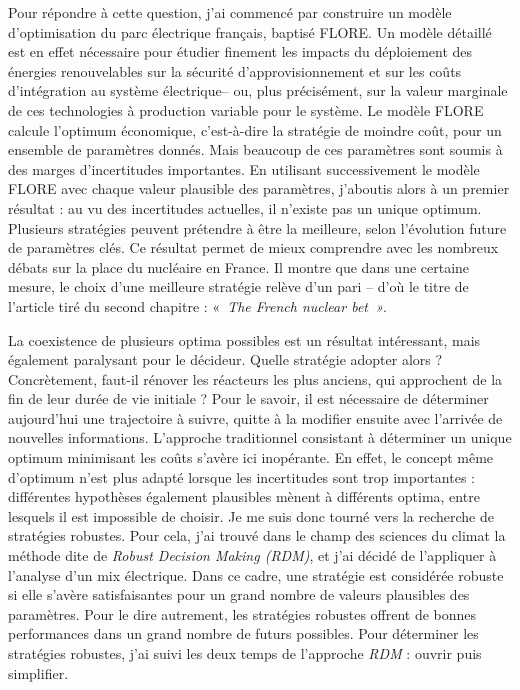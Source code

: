 Pour répondre à cette question, j'ai commencé par construire un modèle d'optimisation du parc électrique français, baptisé FLORE. Un modèle détaillé est en effet nécessaire pour étudier finement les impacts du déploiement des énergies renouvelables sur la sécurité d'approvisionnement et sur les coûts d'intégration au système électrique-- ou, plus précisément, sur la valeur marginale de ces technologies à production variable pour le système.
Le modèle FLORE calcule l'optimum économique, c'est-à-dire la stratégie de moindre coût, pour un ensemble de paramètres donnés. Mais beaucoup de ces paramètres sont soumis à des marges d'incertitudes importantes. En utilisant successivement le modèle FLORE avec chaque valeur plausible des paramètres, j'aboutis alors à un premier résultat : au vu des incertitudes actuelles, il n'existe pas un unique optimum. Plusieurs stratégies peuvent prétendre à être la meilleure, selon l'évolution future de paramètres clés.
Ce résultat permet de mieux comprendre avec les nombreux débats sur la place du nucléaire en France. Il montre que dans une certaine mesure, le choix d'une meilleure stratégie relève d'un pari -- d'où le titre de l'article tiré du second chapitre : «~\textit{The French nuclear bet~»}.


La coexistence de plusieurs optima possibles est un résultat intéressant, mais également paralysant pour le décideur. Quelle stratégie adopter alors ? Concrètement, faut-il rénover les réacteurs les plus anciens, qui approchent de la fin de leur durée de vie initiale ? Pour le savoir, il est nécessaire de déterminer aujourd'hui une trajectoire à suivre, quitte à la modifier ensuite avec l'arrivée de nouvelles informations.
L'approche traditionnel consistant à déterminer un unique optimum minimisant les coûts s'avère ici inopérante. En effet, le concept même d’optimum n’est plus adapté lorsque les incertitudes sont trop importantes : différentes hypothèses également plausibles mènent à différents optima, entre lesquels il est impossible de choisir. 
Je me suis donc tourné vers la recherche de stratégies robustes. Pour cela, j'ai trouvé dans le champ des sciences du climat la méthode dite de \textit{Robust Decision Making (RDM)}, et j'ai décidé de l'appliquer à l'analyse d'un mix électrique. Dans ce cadre, une stratégie est considérée robuste si elle s'avère satisfaisantes pour un grand nombre de valeurs plausibles des paramètres. Pour le dire autrement, les stratégies robustes offrent de bonnes performances dans un grand nombre de futurs possibles. 
Pour déterminer les stratégies robustes, j'ai suivi les deux temps de l'approche \textit{RDM} : ouvrir puis simplifier. 
	
